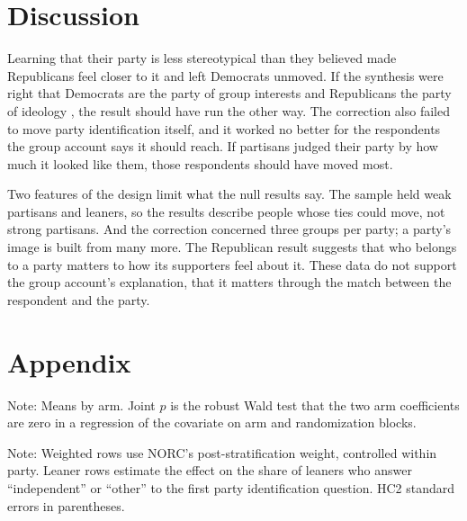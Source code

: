 \documentclass[11pt]{article}
\newcommand{\TableStyle}{\small\setlength{\tabcolsep}{5pt}\renewcommand{\arraystretch}{1.05}}
\begin{document}
\section{Discussion}

Learning that their party is less stereotypical than they believed made Republicans feel closer to it and left Democrats unmoved. If the synthesis were right that Democrats are the party of group interests and Republicans the party of ideology \citep{grossmann2016}, the result should have run the other way. The correction also failed to move party identification itself, and it worked no better for the respondents the group account says it should reach. If partisans judged their party by how much it looked like them, those respondents should have moved most.

Two features of the design limit what the null results say. The sample held weak partisans and leaners, so the results describe people whose ties could move, not strong partisans. And the correction concerned three groups per party; a party's image is built from many more. The Republican result suggests that who belongs to a party matters to how its supporters feel about it. These data do not support the group account's explanation, that it matters through the match between the respondent and the party.




\appendix
\section*{Appendix}
\setcounter{table}{0}
\renewcommand{\thetable}{A\arabic{table}}

\begin{table}[H]
\centering
\caption{Covariate balance by arm}
\label{tab:balance}
{\TableStyle{}}
\par\smallskip
\begin{minipage}{0.95\linewidth}\footnotesize
Note: Means by arm. Joint $p$ is the robust Wald test that the two arm coefficients are zero in a regression of the covariate on arm and randomization blocks.
\end{minipage}
\end{table}

\begin{table}[H]
\centering
\caption{Weighted estimates and the leaners' party label}
\label{tab:robustness}
{\TableStyle{}}
\par\smallskip
\begin{minipage}{0.95\linewidth}\footnotesize
Note: Weighted rows use NORC's post-stratification weight, controlled within party. Leaner rows estimate the effect on the share of leaners who answer ``independent'' or ``other'' to the first party identification question. HC2 standard errors in parentheses.
\end{minipage}
\end{table}
\end{document}
